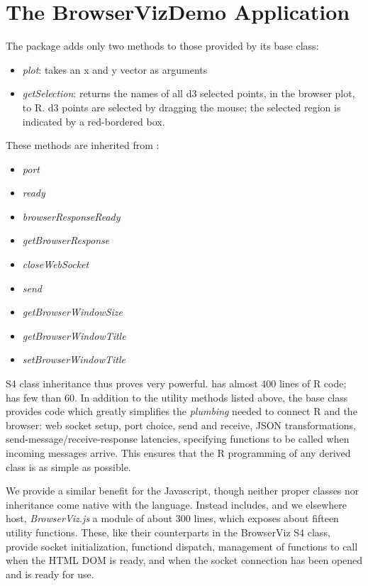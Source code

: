 \documentclass{article}
\begin{document}
\section{The BrowserVizDemo Application}

The  package adds only two methods to those provided by its base class:

\begin{itemize}
   \item \emph{plot}: takes an x and y vector as arguments
   \item \emph{getSelection}:  returns the names of all d3 selected points, in the browser plot, to R.
     d3 points are selected by dragging the mouse; the selected region is indicated by a red-bordered
     box.
\end{itemize}

These methods are inherited from :

\begin{itemize}
   \item \emph{port}
   \item \emph{ready}
   \item \emph{browserResponseReady}
   \item \emph{getBrowserResponse}
   \item \emph{closeWebSocket}
   \item \emph{send}
   \item \emph{getBrowserWindowSize}
   \item \emph{getBrowserWindowTitle}
   \item \emph{setBrowserWindowTitle}
\end{itemize}

S4 class inheritance thus proves very powerful.   has almost 400 lines of R code;
 has few than 60.  In addition to the utility methods listed above, the base
class provides code which greatly simplifies the \emph{plumbing} needed to connect R and the browser:
web socket setup, port choice, send and receive, JSON transformations, send-message/receive-response
latencies, specifying functions to be called when incoming messages arrive.  This ensures that the R 
programming of any derived class is as simple as possible.

We provide a similar benefit for the Javascript, though neither proper classes nor inheritance 
come native with the language.  Instead  includes, and we elsewhere host, 
\emph{BrowserViz.js} a module of about 300 lines, which exposes about fifteen utility functions.  These,
like their counterparts in the BrowserViz S4 class, provide socket initialization, functiond dispatch, 
management of functions to call when the HTML DOM is ready, and when the socket connection has been
opened and is ready for use.   
\end{document}
